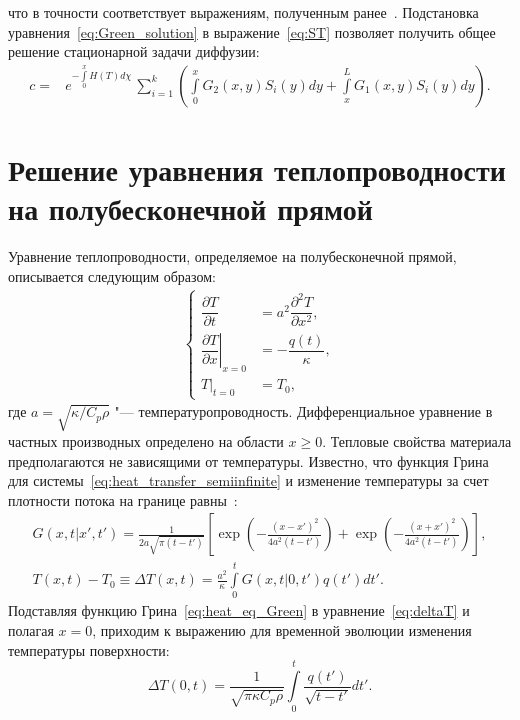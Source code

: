 что в точности соответствует выражениям, полученным ранее~\cite{Denis2022}. Подстановка уравнения~\eqref{eq:Green_solution} в выражение~\eqref{eq:ST} позволяет получить общее решение стационарной задачи диффузии:
\begin{align}
	c= & e^{-\int\limits_0^x H(T)d\chi}\,\sum\limits_{i=1}^k \left( \int\limits_0^x G_2(x,y)S_i(y)dy + \int\limits_x^L G_1(x,y)S_i(y)dy \right).\nonumber
\end{align}

\chapter{Решение уравнения теплопроводности на полубесконечной прямой}\label{app:F}

Уравнение теплопроводности, определяемое на полубесконечной прямой, описывается следующим образом:
\begin{align}
	\label{eq:heat_transfer_semiinfinite}
	\begin{cases}
		\dfrac{\partial T}{\partial t} & = a^2 \dfrac{\partial^2 T}{\partial x^2}, \\[5pt]
		\left.\dfrac{\partial T}{\partial x}\right\vert_{x=0}& = -\dfrac{q(t)}{\kappa},                \\[5pt]
        \left. T \right\vert_{t=0} & = T_0,
	\end{cases}
\end{align}
где \( a = \sqrt{\kappa/C_p\rho} \) "--- температуропроводность. Дифференциальное уравнение в частных производных определено на области \( x \geq 0 \). Тепловые свойства материала предполагаются не зависящими от температуры. Известно, что функция Грина для системы~\cref{eq:heat_transfer_semiinfinite} и изменение температуры за счет плотности потока на границе равны~\cite{Bechtel1975}:
\begin{subequations}
    \begin{gather}
        G(x,t|x',t') = \frac{1}{2a\sqrt{\pi(t-t')}} \left[ \exp \left( -\frac{(x-x')^2}{4a^2(t-t')} \right) + \exp \left( -\frac{(x+x')^2}{4a^2(t-t')} \right) \right],\label{eq:heat_eq_Green}\\
        T(x,t)-T_0 \equiv \Delta T(x,t) = \frac{a^2}{\kappa} \int\limits_0^t G(x,t|0,t')q(t')dt'. \label{eq:deltaT}
    \end{gather}
\end{subequations}
Подставляя функцию Грина~\cref{eq:heat_eq_Green} в уравнение~\cref{eq:deltaT} и полагая \(x=0\), приходим к выражению для временной эволюции изменения температуры поверхности:
\begin{equation}
    \Delta T(0,t) = \frac{1}{\sqrt{\pi\kappa C_p \rho}} \int\limits_0^t \frac{q(t')}{\sqrt{t-t'}}dt'.
\end{equation}

